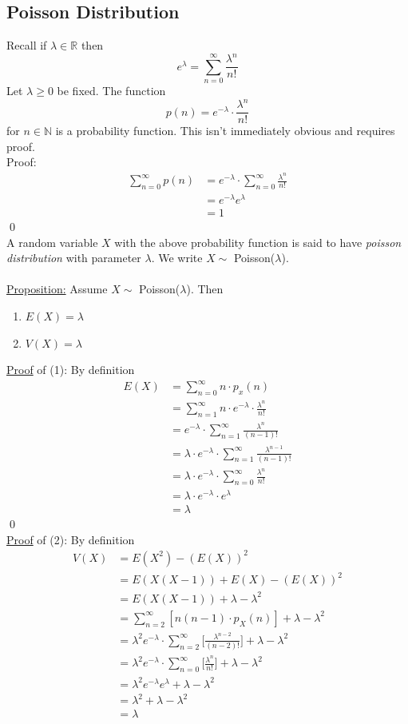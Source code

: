 \documentclass{article}
\newcommand{\ti}[1]{\textit{#1}}
\newcommand{\N}{\mathbb{N}}
\newcommand{\R}{\mathbb{R}}
\newcommand{\la}{\lambda}
\newcommand{\x}{\cdot}
\begin{document}
\subsection{Poisson Distribution}
Recall if $\la \in \R$ then
\[e^{\la} = \sum_{n=0}^{\infty} \frac{\la^{n}}{n!}\]
Let $\la \geq 0$ be fixed. The function
\[p(n) = e^{-\la}\x \frac{\la^{n}}{n!}\]
for $n \in\N$ is a probability function. This isn't immediately obvious and requires proof.\\
Proof:
\begin{align*}
	\sum_{n=0}^{\infty} p(n) &= e^{-\la}\x \sum_{n=0}^{\infty} \frac{\la^{n}}{n!}\\
						&= e^{-\la}e^{\la}\\
						&= 1
\end{align*}
\qed\\
A random variable $X$ with the above probability function is said to have \ti{poisson distribution} with parameter $\la$. We write $X \sim$ Poisson($\la$).\\\\
\underline{Proposition:} Assume $X \sim$ Poisson($\la$). Then
\begin{enumerate}
	\item $E(X) = \la$
	\item $V(X) = \la$
\end{enumerate}
\underline{Proof} of (1): By definition
\begin{align*}
	E(X) &= \sum_{n=0}^{\infty} n\x p_{x}(n)\\
		&= \sum_{n=1}^{\infty} n\x e^{-\la}\x \frac{\la^{n}}{n!}\\
		&= e^{-\la}\x \sum_{n=1}^{\infty} \frac{\la^{n}}{(n-1)!}\\
		&= \la\x e^{-\la}\x \sum_{n=1}^{\infty} \frac{\la^{n-1}}{(n-1)!}\\
		&= \la\x e^{-\la}\x \sum_{n=0}^{\infty} \frac{\la^{n}}{n!}\\
		&= \la\x e^{-\la}\x e^{\la}\\
		&= \la
\end{align*}
\qed\\
\underline{Proof} of (2): By definition
\begin{align*}
	V(X) &= E(X^{2}) - (E(X))^{2}\\
		&= E(X(X-1)) + E(X) - (E(X))^{2}\\
		&= E(X(X-1)) + \la - \la^{2}\\
		&= \sum_{n=2}^{\infty}[n(n-1)\x p_{X}(n)] +\la - \la^{2}\\
		&= \la^{2} e^{-\la}\x \sum_{n=2}^{\infty} \bigg[\frac{\la^{n-2}}{(n-2)!}\bigg] +\la - \la^{2}\\
		&= \la^{2} e^{-\la}\x \sum_{n=0}^{\infty} \bigg[\frac{\la^{n}}{n!}\bigg] +\la - \la^{2}\\
		&= \la^{2} e^{-\la} e^{\la} +\la - \la^{2}\\
		&= \la^{2} +\la - \la^{2}\\
		&= \la
\end{align*}
\end{document}
